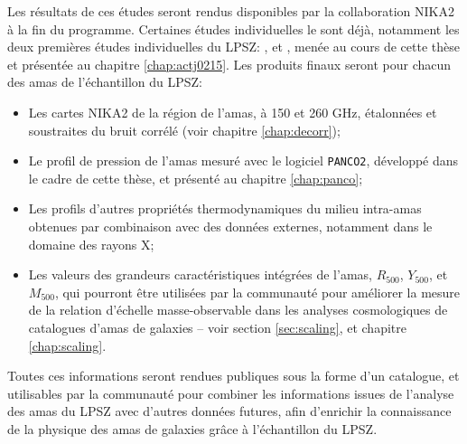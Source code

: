 Les résultats de ces études seront rendus disponibles par la collaboration NIKA2 à la fin du programme.
Certaines études individuelles le sont déjà, notamment les deux premières études individuelles du LPSZ: \cite{ruppin_first_2018}, et \cite{keruzore_exploiting_2020}, menée au cours de cette thèse et présentée au chapitre \ref{chap:actj0215}.
Les produits finaux seront pour chacun des amas de l'échantillon du LPSZ:
\begin{itemize}[leftmargin=*]
\setlength\itemsep{5pt}
    \item Les cartes NIKA2 de la région de l'amas, à 150 et 260 GHz, étalonnées et soustraites du bruit corrélé (voir chapitre \ref{chap:decorr});
    \item Le profil de pression de l'amas mesuré avec le logiciel \texttt{PANCO2}, développé dans le cadre de cette thèse, et présenté au chapitre \ref{chap:panco};
    \item Les profils d'autres propriétés thermodynamiques du milieu intra-amas obtenues par combinaison avec des données externes, notamment dans le domaine des rayons X; %
    \item Les valeurs des grandeurs caractéristiques intégrées de l'amas, $R_{500}$, $Y_{500}$, et $M_{500}$, qui pourront être utilisées par la communauté pour améliorer la mesure de la relation d'échelle masse-observable dans les analyses cosmologiques de catalogues d'amas de galaxies -- voir section \ref{sec:scaling}, et chapitre \ref{chap:scaling}.
\end{itemize}
Toutes ces informations seront rendues publiques sous la forme d'un catalogue, et utilisables par la communauté pour combiner les informations issues de l'analyse des amas du LPSZ avec d'autres données futures, afin d'enrichir la connaissance de la physique des amas de galaxies grâce à l'échantillon du LPSZ.

